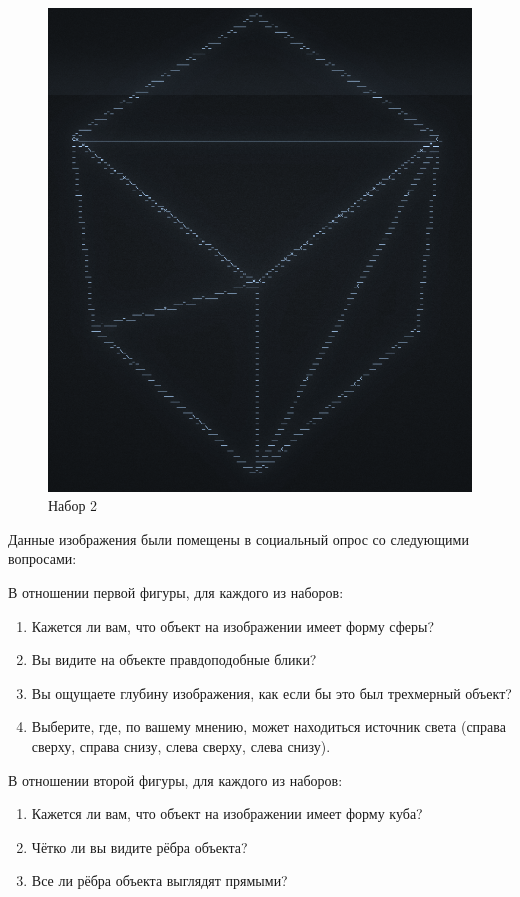 \begin{figure}[H]
\begin{minipage}{0.45\textwidth}
        \centering
        \includegraphics[width=\linewidth]{images/shapequat.png}
        \caption{Набор 2}
	\label{fig:shapequat}
    \end{minipage}
\end{figure}

Данные изображения были помещены в социальный опрос со следующими вопросами:

В отношении первой фигуры, для каждого из наборов:
\begin{enumerate}
    \item Кажется ли вам, что объект на изображении имеет форму сферы?
    \item Вы видите на объекте правдоподобные блики?
    \item Вы ощущаете глубину изображения, как если бы это был трехмерный объект?
    \item Выберите, где, по вашему мнению, может находиться источник света (справа сверху, справа снизу, слева сверху, слева снизу).
\end{enumerate}

В отношении второй фигуры, для каждого из наборов:
\begin{enumerate}
    \item Кажется ли вам, что объект на изображении имеет форму куба?
    \item Чётко ли вы видите рёбра объекта?
    \item Все ли рёбра объекта выглядят прямыми?
\end{enumerate}

